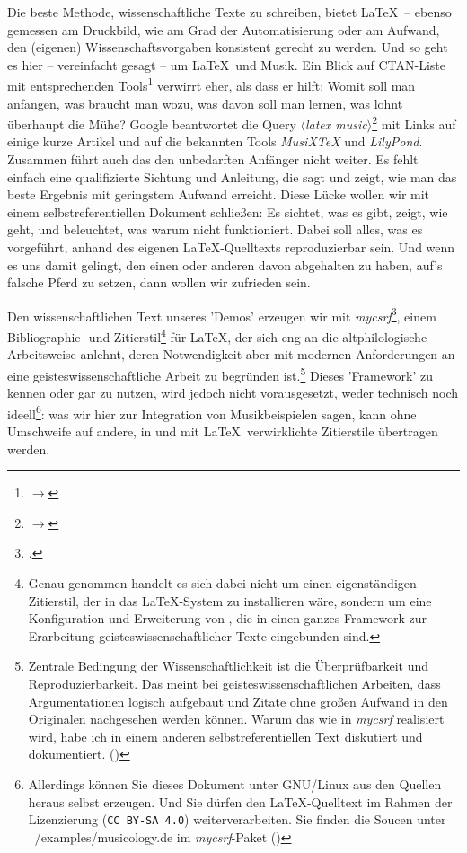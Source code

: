 Die beste Methode, wissenschaftliche Texte zu schreiben, bietet \LaTeX\ --
ebenso gemessen am Druckbild, wie am Grad der Automatisierung oder am Aufwand,
den (ei\-ge\-nen) Wissenschaftsvorgaben konsistent gerecht zu werden. Und so
geht es hier -- vereinfacht gesagt -- um \LaTeX\ und Musik. Ein Blick auf
CTAN-Liste mit entsprechenden Tools\footnote{$\rightarrow$
} verwirrt eher, als dass er
hilft: Womit soll man anfangen, was braucht man wozu, was davon soll man lernen,
was lohnt überhaupt die Mühe? Google beantwortet die Query
$\langle$\textit{latex music}$\rangle$\footnote{$\rightarrow$
} mit Links auf einige kurze
Artikel und auf die bekannten Tools \textit{MusiX\TeX} und \textit{LilyPond}.
Zusammen führt auch das den unbedarften Anfänger nicht weiter. Es fehlt einfach
eine qualifizierte Sichtung und Anleitung, die sagt und zeigt, wie man das beste
Ergebnis mit geringstem Aufwand erreicht. Diese Lücke wollen wir mit einem
selbstreferentiellen Dokument schließen: Es sichtet, was es gibt, zeigt, wie
geht, und beleuchtet, was warum nicht funktioniert. Dabei soll alles, was es
vorgeführt, anhand des eigenen \LaTeX-Quelltexts reproduzierbar sein. Und wenn
es uns damit gelingt, den einen oder anderen davon abgehalten zu haben, auf's
falsche Pferd zu setzen, dann wollen wir zufrieden sein.

Den wissenschaftlichen Text unseres 'Demos' erzeugen wir mit
\textit{mycsrf}\footcite[vgl.][\nopage wp]{Reincke2018a}, einem Bibliographie-
und Zitierstil\footnote{Genau genommen handelt es sich dabei nicht um einen
eigenständigen Zitierstil, der in das \LaTeX-System zu installieren wäre,
sondern um eine Konfiguration und Erweiterung von , die in einen
ganzes Framework zur Erarbeitung geisteswissenschaftlicher Texte eingebunden
sind.} für \LaTeX, der sich eng an die altphilologische Arbeitsweise anlehnt,
deren Notwendigkeit aber mit modernen Anforderungen an eine
geisteswissenschaftliche Arbeit zu begründen ist.\footnote{Zentrale Bedingung
der Wissenschaftlichkeit ist die Überprüfbarkeit und Reproduzierbarkeit. Das
meint bei geisteswissenschaftlichen Arbeiten, dass Argumentationen logisch
aufgebaut und Zitate ohne großen Aufwand in den Originalen nachgesehen werden
können. Warum das wie in \textit{mycsrf} realisiert wird, habe ich in einem
anderen selbstreferentiellen Text diskutiert und dokumentiert. (\cite[Vgl.
dazu][1ff]{Reincke2018b})} Dieses 'Framework' zu kennen oder gar zu nutzen, wird
jedoch nicht vorausgesetzt, weder technisch noch ideell\footnote{Allerdings
können Sie dieses Dokument unter GNU/Linux aus den Quellen heraus selbst
erzeugen. Und Sie dürfen den \LaTeX-Quelltext im Rahmen der Lizenzierung
(\texttt{CC BY-SA 4.0}) weiterverarbeiten. Sie finden die Soucen unter
~/examples/musicology.de im \textit{mycsrf}-Paket (\cite[Vgl. dazu][\nopage
wp]{Reincke2019a})}: was wir hier zur Integration von Musikbeispielen sagen,
kann ohne Umschweife auf andere, in und mit \LaTeX\ verwirklichte Zitierstile
übertragen werden.

